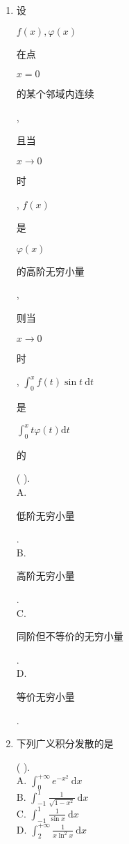 \documentclass[10pt]{article}
\begin{document}
\begin{enumerate}
  \item \begin{CJK}{UTF8}{mj}设\end{CJK} $f(x), \varphi(x)$ \begin{CJK}{UTF8}{mj}在点\end{CJK} $x=0$ \begin{CJK}{UTF8}{mj}的某个邻域内连续\end{CJK}, \begin{CJK}{UTF8}{mj}且当\end{CJK} $x \rightarrow 0$ \begin{CJK}{UTF8}{mj}时\end{CJK}, $f(x)$ \begin{CJK}{UTF8}{mj}是\end{CJK} $\varphi(x)$ \begin{CJK}{UTF8}{mj}的高阶无穷小量\end{CJK}, \begin{CJK}{UTF8}{mj}则当\end{CJK} $x \rightarrow 0$ \begin{CJK}{UTF8}{mj}时\end{CJK}, $\int_{0}^{x} f(t) \sin t \mathrm{~d} t$ \begin{CJK}{UTF8}{mj}是\end{CJK} $\int_{0}^{x} t \varphi(t) \mathrm{d} t$ \begin{CJK}{UTF8}{mj}的\end{CJK} ( ).\\
A. \begin{CJK}{UTF8}{mj}低阶无穷小量\end{CJK}.\\
B. \begin{CJK}{UTF8}{mj}高阶无穷小量\end{CJK}.\\
C. \begin{CJK}{UTF8}{mj}同阶但不等价的无穷小量\end{CJK}.\\
D. \begin{CJK}{UTF8}{mj}等价无穷小量\end{CJK}.

  \item \begin{CJK}{UTF8}{mj}下列广义积分发散的是\end{CJK} ( ).\\
A. $\int_{0}^{+\infty} e^{-x^{2}} \mathrm{~d} x$\\
B. $\int_{-1}^{1} \frac{1}{\sqrt{1-x^{2}}} \mathrm{~d} x$\\
C. $\int_{-1}^{1} \frac{1}{\sin x} \mathrm{~d} x$\\
D. $\int_{2}^{+\infty} \frac{1}{x \ln ^{2} x} \mathrm{~d} x$


\end{enumerate}
\end{document}
